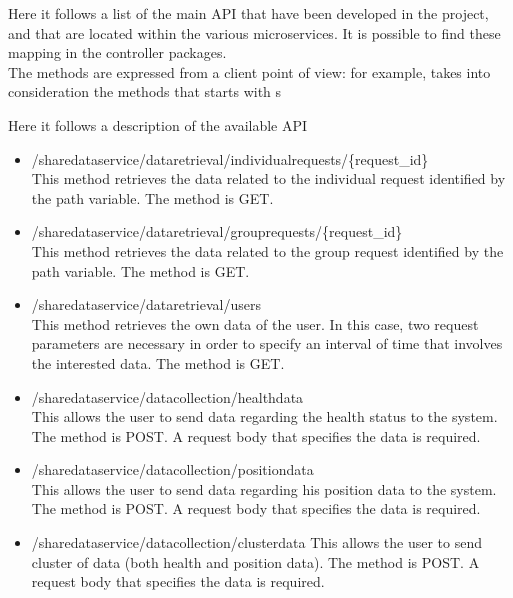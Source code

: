 Here it follows a list of the main API that have been developed in the project, and that are located
within the various microservices.
It is possible to find these mapping in the controller packages. \\
The methods are expressed from a client point of view: for example, takes into consideration the methods that starts with s 

Here it follows a description of the available API

\begin{itemize}
\item /sharedataservice/dataretrieval/individualrequests/\{request\_id\} \\
This method retrieves the data related to the individual request identified by the path variable. The method is GET.

\item /sharedataservice/dataretrieval/grouprequests/\{request\_id\} \\
This method retrieves the data related to the group request identified by the path variable. The method is GET.

\item /sharedataservice/dataretrieval/users \\
This method retrieves the own data of the user. In this case, two request parameters
are necessary in order to specify an interval of time that involves the interested data.
The method is GET.

\item /sharedataservice/datacollection/healthdata \\
This allows the user to send data regarding the health status to the system. The method is POST.
A request body that specifies the data is required.

\item /sharedataservice/datacollection/positiondata \\
This allows the user to send data regarding his position data to the system. The method is POST.
A request body that specifies the data is required.

\item /sharedataservice/datacollection/clusterdata
This allows the user to send cluster of data (both health and position data). The method is POST.
A request body that specifies the data is required.

\end{itemize}



